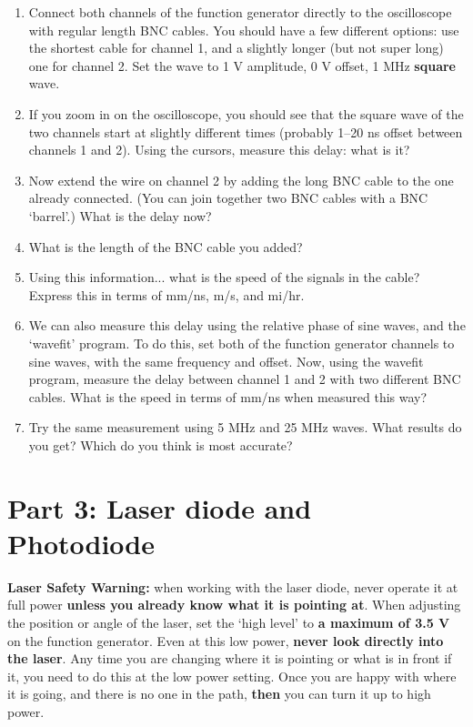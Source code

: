 \documentclass[12pt, letterpaper]{article}
\begin{document}
\begin{enumerate}
	\item Connect both channels of the function generator directly to the oscilloscope with regular length BNC cables.
	You should have a few different options: use the shortest cable for channel 1, and a slightly longer (but not super long) one for channel 2.
	Set the wave to 1 V amplitude, 0 V offset, 1 MHz \textbf{square} wave.
	\item If you zoom in on the oscilloscope, you should see that the square wave of the two channels start at slightly different times (probably 1--20 ns offset between channels 1 and 2).  Using the cursors, measure this delay: what is it?

	\answergrid{3cm}
	\item Now extend the wire on channel 2 by adding the long BNC cable to the one already connected.  (You can join together two BNC cables with a BNC `barrel'.)  What is the delay now?

	\answergrid{3cm}
	\item What is the length of the BNC cable you added?

	\answergrid{3cm}
	\item Using this information... what is the speed of the signals in the cable?  Express this in terms of mm/ns, m/s, and mi/hr.

	\answergrid{5cm}
	\item We can also measure this delay using the relative phase of sine waves, and the `wavefit' program.  To do this, set both of the function generator channels to sine waves, with the same frequency and offset.  Now, using the wavefit program, measure the delay between channel 1 and 2 with two different BNC cables.  What is the speed in terms of mm/ns when measured this way?

	\answergrid{5cm}
	\item Try the same measurement using 5 MHz and 25 MHz waves.  What results do you get?  Which do you think is most accurate?

	\fillanswergrid
\end{enumerate}

\section{Part 3: Laser diode and Photodiode}
{\large
\textbf{Laser Safety Warning:} when working with the laser diode, never operate it at full power \textbf{unless you already know what it is pointing at}.  
When adjusting the position or angle of the laser, set the `high level' to \textbf{a maximum of 3.5 V} on the function generator.
Even at this low power, \textbf{never look directly into the laser}.
Any time you are changing where it is pointing or what is in front if it, you need to do this at the low power setting.
Once you are happy with where it is going, and there is no one in the path, \textbf{then} you can turn it up to high power.
}
\end{document}
